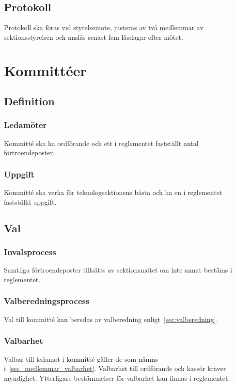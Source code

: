 \documentclass[a4paper]{dtek}
\begin{document}
\subsection{Protokoll}
Protokoll ska föras vid styrelsemöte, justeras av två medlemmar av
sektionsstyrelsen och anslås senast fem läsdagar efter mötet.
\newpage

\section{Kommittéer}
\subsection{Definition}
\subsubsection{Ledamöter}
Kommitté ska ha ordförande och ett i reglementet fastställt antal förtroendeposter.

\subsubsection{Uppgift}
Kommitté ska verka för teknologsektionens bästa och ha en i reglementet fastställd uppgift.

\subsection{Val}
\subsubsection{Invalsprocess}
Samtliga förtroendeposter tillsätts av sektionsmötet om inte annat bestäms i reglementet.
\subsubsection{Valberedningsprocess}
Val till kommitté kan beredas av valberedning enligt~\ref{sec:valberedning}.

\subsubsection{Valbarhet}
Valbar till ledamot i kommitté gäller de som nämns i~\ref{sec_medlemmar_valbarhet}.
Valbarhet till ordförande och kassör kräver myndighet.
Ytterligare bestämmelser för valbarhet kan finnas i reglementet.
\end{document}
